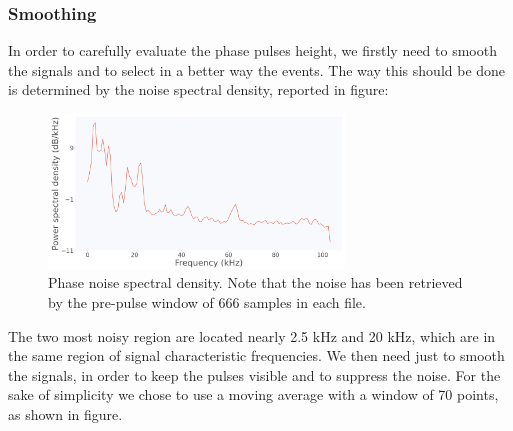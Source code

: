 \documentclass[12pt]{article}
\begin{document}
\subsubsection{Smoothing}
In order to carefully evaluate the phase pulses height, we firstly need to smooth the signals and to select in a better way the events. The way this should be done is determined by the noise spectral density, reported in figure:
\begin{figure}[H]
\centering
\includegraphics[width=0.7\textwidth]{spectral density.png}
\caption{Phase noise spectral density. Note that the noise has been retrieved by the pre-pulse window of 666 samples in each file.}
\end{figure}
The two most noisy region are located nearly 2.5 kHz and 20 kHz, which are in the same region of signal characteristic frequencies. We then need just to smooth the signals, in order to keep the pulses visible and to suppress the noise. For the sake of simplicity we chose to use a moving average with a window of 70 points, as shown in figure. 
\end{document}
